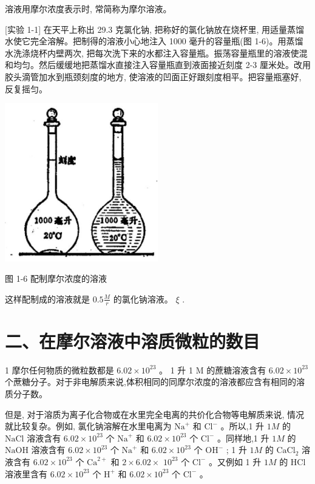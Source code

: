 \documentclass[10pt]{article}
\begin{document}
溶液用摩尔浓度表示时, 常简称为摩尔溶液。

[实验 1-1] 在天平上称出 29.3 克氯化钠, 把称好的氯化钠放在烧杯里, 用适量蒸馏水使它完全溶解。把制得的溶液小心地注入 1000 毫升的容量瓶(图 1-6)。用蒸馏水洗涤烧杯内壁两次, 把每次洗下来的水都注入容量瓶。振荡容量瓶里的溶液使混和均匀。然后缓缓地把蒸馏水直接注入容量瓶直到液面接近刻度 2-3 厘米处。改用胶头滴管加水到瓶颈刻度的地方, 使溶液的凹面正好跟刻度相平。把容量瓶塞好, 反复摇匀。

\begin{center}
\includegraphics[max width=0.5\textwidth]{images/01912d0f-097c-7e75-8f32-4f326cd86c9f_20_483453.jpg}
\end{center}

图 1-6 配制摩尔浓度的溶液

这样配制成的溶液就是 \({0.5}\frac{M}{r}\) 的氯化钠溶液。 \(\xi\) .

\section*{二、在摩尔溶液中溶质微粒的数目}

1 摩尔任何物质的微粒数都是 \({6.02} \times {10}^{23}\) 。 1 升 1 M 的蔗糖溶液含有 \({6.02} \times {10}^{23}\) 个蔗糖分子。对于非电解质来说,体积相同的同摩尔浓度的溶液都应含有相同的溶质分子数。

但是, 对于溶质为离子化合物或在水里完全电离的共价化合物等电解质来说, 情况就比较复杂。例如, 氯化钠溶解在水里电离为 \({\mathrm{{Na}}}^{ + }\) 和 \({\mathrm{{Cl}}}^{ - }\) 。所以,1 升 \({1M}\) 的 \(\mathrm{{NaCl}}\) 溶液含有 \({6.02} \times {10}^{23}\) 个 \({\mathrm{{Na}}}^{ + }\) 和 \({6.02} \times {10}^{23}\) 个 \({\mathrm{{Cl}}}^{ - }\) 。同样地,1 升 \({1M}\) 的 \(\mathrm{{NaOH}}\) 溶液含有 \({6.02} \times {10}^{23}\) 个 \({\mathrm{{Na}}}^{ + }\) 和 \({6.02} \times {10}^{23}\) 个 \({\mathrm{{OH}}}^{ - }\) ; 1 升 \({1M}\) 的 \({\mathrm{{CaCl}}}_{2}\) 溶液含有 \({6.02} \times {10}^{23}\) 个 \({\mathrm{{Ca}}}^{2 + }\) 和 \(2 \times {6.02} \times\) \({10}^{23}\) 个 \({\mathrm{{Cl}}}^{ - }\) 。又例如 1 升 \({1M}\) 的 \(\mathrm{{HCl}}\) 溶液里含有 \({6.02} \times {10}^{23}\) 个 \({\mathrm{H}}^{ + }\) 和 \({6.02} \times {10}^{23}\) 个 \({\mathrm{{Cl}}}^{ - }\) 。
\end{document}
